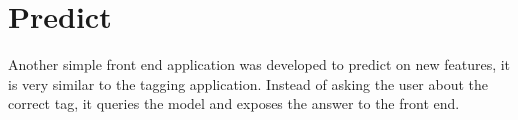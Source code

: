 \begin{figure}[h]
  \begin{center}
  \end{center}
\end{figure}

\begin{figure}[h]
  \begin{center}
  \end{center}
\end{figure}

\section{Predict}

Another simple front end application was developed to predict on new features, it is very similar to the tagging application. Instead of asking the user about the correct tag, it queries the model and exposes the answer to the front end.\\

